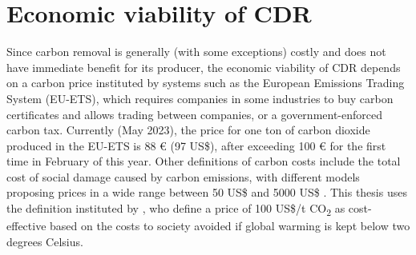\section{Economic viability of CDR}
Since carbon removal is generally (with some exceptions) costly and does not have immediate benefit for its producer, the economic viability of CDR depends on a carbon price instituted by systems such as the European Emissions Trading System (EU-ETS), which requires companies in some industries to buy carbon certificates and allows trading between companies, or a government-enforced carbon tax. Currently (May 2023), the price for one ton of carbon dioxide produced in the EU-ETS is 88 € (97 US\$), after exceeding 100 € for the first time in February of this year. Other definitions of carbon costs include the total cost of social damage caused by carbon emissions, with different models proposing prices in a wide range between 50 US\$ and 5000 US\$ \parencite[1,7]{Kikstra2021TheVariability}. This thesis uses the definition instituted by \textcite[3]{Griscom2017NaturalSolutions}, who define a price of 100 US\$/t CO\textsubscript{2} as cost-effective based on the costs to society avoided if global warming is kept below two degrees Celsius.